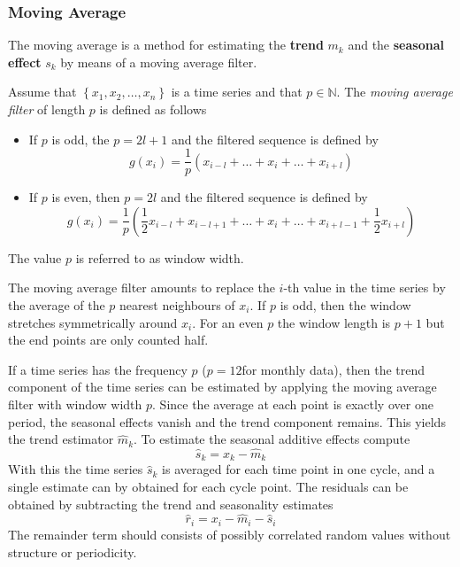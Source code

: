 \documentclass[11pt]{article}
\begin{document}
\subsubsection{Moving Average}
The moving average is a method for estimating the \textbf{trend} $m_k$ and the \textbf{seasonal effect} $s_k$ by means of a moving average filter.
\begin{definition}
	Assume that $\left\{x_1,x_2,\dots, x_n\right\}$ is a time series and that $p\in\mathbb{N}$. The \emph{moving average filter} of length $p$ is defined as follows
	\begin{itemize}
		\item If $p$ is odd, the $p = 2l + 1$ and the filtered sequence is defined by
		\begin{equation*}
			g(x_i) = \frac{1}{p} (x_{i-l} + \dots + x_i + \dots + x_{i+l})
		\end{equation*}
		\item If $p$ is even, then $p = 2l$ and the filtered sequence is defined by
		\begin{equation*}
			g(x_i) = \frac{1}{p} (\frac{1}{2}x_{i-l} + x_{i-l+1} + \dots + x_i + \dots + x_{i+l-1} + \frac{1}{2} x_{i+l})
		\end{equation*}
	\end{itemize}
	The value $p$ is referred to as window width.
\end{definition}
The moving average filter amounts to replace the $i$-th value in the time series by the average of the $p$ nearest neighbours of $x_i$. If $p$ is odd, then the window stretches symmetrically around $x_i$. For an even $p$ the window length is $p+1$ but the end points are only counted half.

If a time series has the frequency $p$ ($p = 12 $for monthly data), then the trend component of the time series can be estimated by applying the moving average filter with window width $p$. Since the average at each point is exactly over one period, the seasonal effects vanish and the trend component remains. This yields the trend estimator $\hat{m}_k$. To estimate the seasonal additive effects compute
\begin{equation*}
	\hat{s}_k = x_k - \hat{m}_k
\end{equation*}
With this the time series $\hat{s}_k$ is averaged for each time point in one cycle, and a single estimate can by obtained for each cycle point. The residuals can be obtained by subtracting the trend and seasonality estimates
\begin{equation*}
	\hat{r}_i = x_i - \hat{m}_i - \hat{s}_i
\end{equation*}
The remainder term should consists of possibly correlated random values without structure or periodicity.
\end{document}

